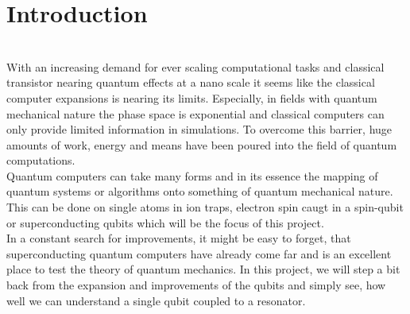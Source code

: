 \chapter{Introduction}
 \\
\noindent
With an increasing demand for ever scaling computational tasks and classical transistor nearing quantum effects at a nano scale it seems like the classical computer expansions is nearing its limits. Especially, in fields with quantum mechanical nature the phase space is exponential and classical computers can only provide limited information in simulations. To overcome this barrier, huge amounts of work, energy and means have been poured into the field of quantum computations. \\
Quantum computers can take many forms and in its essence the mapping of quantum systems or algorithms onto something of quantum mechanical nature. This can be done on single atoms in ion traps, electron spin caugt in a spin-qubit or superconducting qubits which will be the focus of this project. \\
In a constant search for improvements, it might be easy to forget, that superconducting quantum computers have already come far and is an excellent place to test the theory of quantum mechanics. In this project, we will step a bit back from the expansion and improvements of the qubits and simply see, how well we can understand a single qubit coupled to a resonator. 

